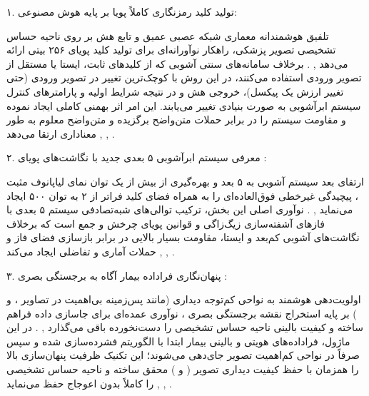 

۱. تولید کلید رمزنگاری کاملاً پویا بر پایه هوش مصنوعی:\par

تلفیق هوشمندانه معماری شبکه عصبی عمیق  و تابع هش  بر روی ناحیه حساس تشخیصی  تصویر پزشکی، راهکار نوآورانه‌ای برای تولید کلید پویای ۲۵۶ بیتی ارائه می‌دهد , . برخلاف سامانه‌های سنتی آشوبی که از کلیدهای ثابت، ایستا یا مستقل از تصویر ورودی استفاده می‌کنند، در این روش با کوچک‌ترین تغییر در تصویر ورودی (حتی تغییر ارزش یک پیکسل)، خروجی هش و در نتیجه شرایط اولیه و پارامترهای کنترل سیستم ابرآشوبی به صورت بنیادی تغییر می‌یابند. این امر اثر بهمنی  کاملی ایجاد نموده و مقاومت سیستم را در برابر حملات متن‌واضح برگزیده  و متن‌واضح معلوم  به طور معناداری ارتقا می‌دهد , , .\par



۲. معرفی سیستم ابرآشوبی ۵ بعدی جدید با نگاشت‌های پویای :\par

ارتقای بعد سیستم آشوبی به ۵ بعد و بهره‌گیری از بیش از یک توان نمای لیاپانوف مثبت ، پیچیدگی غیرخطی فوق‌العاده‌ای را به همراه فضای کلید فراتر از ۲ به توان ۵۰۰  ایجاد می‌نماید , . نوآوری اصلی این بخش، ترکیب توالی‌های شبه‌تصادفی سیستم ۵ بعدی با فازهای آشفته‌سازی زیگ‌زاگی  و قوانین پویای چرخش و جمع   است که برخلاف نگاشت‌های آشوبی کم‌بعد و ایستا، مقاومت بسیار بالایی در برابر بازسازی فضای فاز  و حملات آماری و تفاضلی ایجاد می‌کند , , .\par



۳. پنهان‌نگاری فراداده بیمار آگاه به برجستگی بصری :\par

اولویت‌دهی هوشمند به نواحی کم‌توجه دیداری (مانند پس‌زمینه بی‌اهمیت در تصاویر ،  و ) بر پایه استخراج نقشه برجستگی بصری ، نوآوری عمده‌ای برای جاسازی داده فراهم ساخته و کیفیت بالینی ناحیه حساس تشخیصی را دست‌نخورده باقی می‌گذارد , . در این ماژول، فراداده‌های هویتی و بالینی بیمار ابتدا با الگوریتم  فشرده‌سازی شده و سپس صرفاً در نواحی کم‌اهمیت تصویر جای‌دهی می‌شوند؛ این تکنیک ظرفیت پنهان‌سازی بالا را همزمان با حفظ کیفیت دیداری تصویر ( و   ) محقق ساخته و ناحیه حساس تشخیصی  را کاملاً بدون اعوجاج حفظ می‌نماید , , .\par


